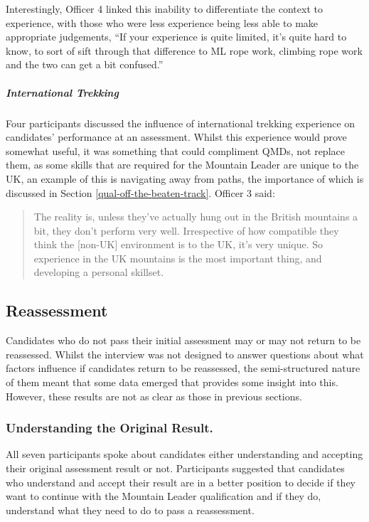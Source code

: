 \documentclass[
  12pt,
  a4paper,
]{book}
\begin{document}
Interestingly, Officer 4 linked this inability to differentiate the context to experience, with those who were less experience being less able to make appropriate judgements, ``If your experience is quite limited, it's quite hard to know, to sort of sift through that difference to ML rope work, climbing rope work and the two can get a bit confused.''

\hypertarget{international-trekking}{%
\subparagraph{International Trekking}\label{international-trekking}}

Four participants discussed the influence of international trekking experience on candidates' performance at an assessment. Whilst this experience would prove somewhat useful, it was something that could compliment QMDs, not replace them, as some skills that are required for the Mountain Leader are unique to the UK, an example of this is navigating away from paths, the importance of which is discussed in Section \ref{qual-off-the-beaten-track}. Officer 3 said:

\begin{quote}
The reality is, unless they've actually hung out in the British mountains a bit, they don't perform very well. Irrespective of how compatible they think the {[}non-UK{]} environment is to the UK, it's very unique. So experience in the UK mountains is the most important thing, and developing a personal skillset.
\end{quote}

\hypertarget{reassessment}{%
\subsection{Reassessment}\label{reassessment}}

Candidates who do not pass their initial assessment may or may not return to be reassessed. Whilst the interview was not designed to answer questions about what factors influence if candidates return to be reassessed, the semi-structured nature of them meant that some data emerged that provides some insight into this. However, these results are not as clear as those in previous sections.

\hypertarget{understanding-the-original-result.}{%
\subsubsection{Understanding the Original Result.}\label{understanding-the-original-result.}}

All seven participants spoke about candidates either understanding and accepting their original assessment result or not. Participants suggested that candidates who understand and accept their result are in a better position to decide if they want to continue with the Mountain Leader qualification and if they do, understand what they need to do to pass a reassessment.
\end{document}
